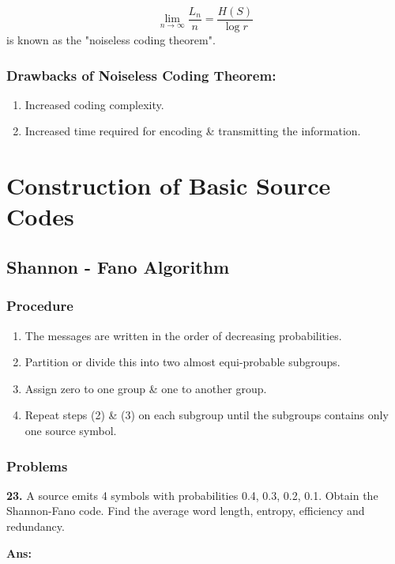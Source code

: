 \documentclass[12pt]{article}
\begin{document}
$$\lim_{n \rightarrow \infty} \frac{L_n}{n} = \frac{H(S)}{\log r}$$ is known as the "noiseless coding theorem".

\subsubsection*{Drawbacks of Noiseless Coding Theorem:}
\begin{enumerate}
	\item Increased coding complexity.
	\item Increased time required for encoding \& transmitting the information.
\end{enumerate}

\section{Construction of Basic Source Codes}

\subsection{Shannon - Fano Algorithm}
\subsubsection*{Procedure}
\begin{enumerate}
	\item The messages are written in the order of decreasing probabilities.
	\item Partition or divide this into two almost equi-probable subgroups.
	\item Assign zero to one group \& one to another group.
	\item Repeat steps (2) \& (3) on each subgroup until the subgroups contains only one source symbol.
\end{enumerate}

\subsubsection*{Problems}

\textbf{23.} A source emits 4 symbols with probabilities 0.4, 0.3, 0.2, 0.1. Obtain the Shannon-Fano code. Find the average word length, entropy, efficiency and redundancy.

\textbf{Ans:}

\vspace*{20pt}
\end{document}
